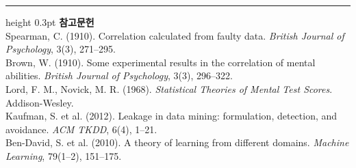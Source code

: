 \documentclass[10pt]{article}
\begin{document}
\vspace{0.6em}
\hrule height 0.3pt
\vspace{0.5em}
{\footnotesize
\textbf{참고문헌}\\[0.3em]
Spearman, C. (1910). Correlation calculated from faulty data.
\emph{British Journal of Psychology}, 3(3), 271--295.\\[0.15em]
Brown, W. (1910). Some experimental results in the correlation of mental
abilities. \emph{British Journal of Psychology}, 3(3), 296--322.\\[0.15em]
Lord, F. M., Novick, M. R. (1968). \emph{Statistical Theories of Mental Test
Scores}. Addison-Wesley.\\[0.15em]
Kaufman, S. et al. (2012). Leakage in data mining: formulation, detection, and
avoidance. \emph{ACM TKDD}, 6(4), 1--21.\\[0.15em]
Ben-David, S. et al. (2010). A theory of learning from different domains.
\emph{Machine Learning}, 79(1--2), 151--175.
}
\end{document}
